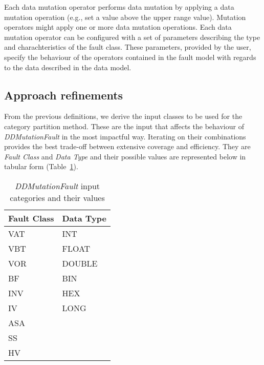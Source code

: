 

Each data mutation operator performs data mutation by applying a data mutation operation (e.g., set a value above the upper range value).
Mutation operators might apply one or more data mutation operations.
Each data mutation operator can be configured with a set of parameters describing the type and charachteristics of the fault class. These parameters, provided by the user, specify the behaviour of the operators contained in the fault model with regards to the data described in the data model.


\clearpage

\subsection{Approach refinements}

From the previous definitions, we derive the input classes to be used for the category partition method.
These are the input that affects the behaviour of \emph{DDMutationFault} in the most impactful way.
Iterating on their combinations provides the best trade-off between extensive coverage and efficiency.
They are \emph{Fault Class} and \emph{Data Type} and their possible values are represented below in tabular form (Table~\ref{table:ddmutation1_categories}).

\begin{table}[h!]
  \scriptsize
  \centering
  \caption{\emph{DDMutationFault} input categories and their values}
  \label{table:ddmutation1_categories}
\begin{tabular}{@{}ll@{}}
  \toprule
\textbf{Fault Class} & \textbf{Data Type} \\ \midrule
VAT           & INT       \\
VBT           & FLOAT     \\
VOR           & DOUBLE    \\
BF            & BIN       \\
INV           & HEX       \\
IV            & LONG      \\
ASA           &           \\
SS            &           \\
HV            &           \\ \bottomrule
\end{tabular}
\end{table}

